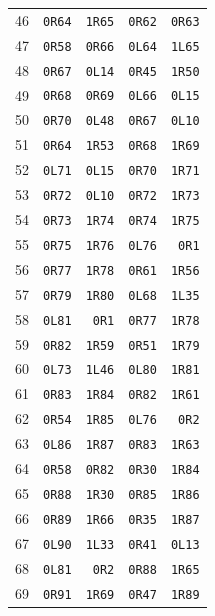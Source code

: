 \begin{longtable}{rrrrr}
46 & \texttt{0R64} & \texttt{1R65} & \texttt{0R62} & \texttt{0R63}\\
47 & \texttt{0R58} & \texttt{0R66} & \texttt{0L64} & \texttt{1L65}\\
48 & \texttt{0R67} & \texttt{0L14} & \texttt{0R45} & \texttt{1R50}\\
49 & \texttt{0R68} & \texttt{0R69} & \texttt{0L66} & \texttt{0L15}\\
50 & \texttt{0R70} & \texttt{0L48} & \texttt{0R67} & \texttt{0L10}\\
51 & \texttt{0R64} & \texttt{1R53} & \texttt{0R68} & \texttt{1R69}\\
52 & \texttt{0L71} & \texttt{0L15} & \texttt{0R70} & \texttt{1R71}\\
53 & \texttt{0R72} & \texttt{0L10} & \texttt{0R72} & \texttt{1R73}\\
54 & \texttt{0R73} & \texttt{1R74} & \texttt{0R74} & \texttt{1R75}\\
55 & \texttt{0R75} & \texttt{1R76} & \texttt{0L76} & \texttt{0R1}\\
56 & \texttt{0R77} & \texttt{1R78} & \texttt{0R61} & \texttt{1R56}\\
57 & \texttt{0R79} & \texttt{1R80} & \texttt{0L68} & \texttt{1L35}\\
58 & \texttt{0L81} & \texttt{0R1} & \texttt{0R77} & \texttt{1R78}\\
59 & \texttt{0R82} & \texttt{1R59} & \texttt{0R51} & \texttt{1R79}\\
60 & \texttt{0L73} & \texttt{1L46} & \texttt{0L80} & \texttt{1R81}\\
61 & \texttt{0R83} & \texttt{1R84} & \texttt{0R82} & \texttt{1R61}\\
62 & \texttt{0R54} & \texttt{1R85} & \texttt{0L76} & \texttt{0R2}\\
63 & \texttt{0L86} & \texttt{1R87} & \texttt{0R83} & \texttt{1R63}\\
64 & \texttt{0R58} & \texttt{0R82} & \texttt{0R30} & \texttt{1R84}\\
65 & \texttt{0R88} & \texttt{1R30} & \texttt{0R85} & \texttt{1R86}\\
66 & \texttt{0R89} & \texttt{1R66} & \texttt{0R35} & \texttt{1R87}\\
67 & \texttt{0L90} & \texttt{1L33} & \texttt{0R41} & \texttt{0L13}\\
68 & \texttt{0L81} & \texttt{0R2} & \texttt{0R88} & \texttt{1R65}\\
69 & \texttt{0R91} & \texttt{1R69} & \texttt{0R47} & \texttt{1R89}\\

\end{longtable}
